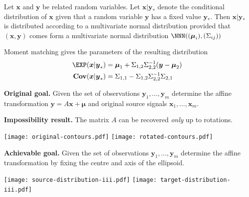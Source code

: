 \documentclass[landscape,footrule]{foils}
\renewcommand{\vec}[1]{\boldsymbol{#1}}
\newcommand{\COV}{\mathbf{Cov}}
\begin{document}
Let $\vec{x}$ and $\vec{y}$ be related random variables. 
Let $\vec{x}|\vec{y}_*$ denote the conditional distribution of $\vec{x}$ given that a random variable $\vec{y}$ has a fixed value $\vec{y}_*$.
Then $\vec{x}|\vec{y}_*$ is distributed according to a multivariate normal distribution provided that 
 $(\vec{x},\vec{y})$ comes form a multivariate normal distribution $\NNN((\vec{\mu}_i),(\Sigma_{ij}))$

\begin{triangles}
\item Moment matching gives the parameters of the resulting distribution 
\begin{align*}
\EXP(\vec{x}|\vec{y}_*)&= \vec{\mu}_1+ \Sigma_{1,2}\Sigma_{2,2}^{-1}(\vec{y}-\vec{\mu}_2)\\
\COV(\vec{x}|\vec{y}_*)&= \Sigma_{1,1}-\Sigma_{1,2}\Sigma_{2,2}^{-1}\Sigma_{2,1}\\
\end{align*}
\end{triangles}







\textbf{Original goal.} 
Given the set of observations $\vec{y}_1,\ldots, \vec{y}_m$ determine the affine transformation $\vec{y}=A\vec{x}+\vec{\mu}$ and original source signals  $\vec{x}_1,\ldots, \vec{x}_m$.


\textbf{Impossibility result.}
The matrix $A$ can be recovered \emph{only} up to rotations.


\begin{center}
\texttt{[image: original-contours.pdf]}
\raisebox{4.0cm}{$\quad\xrightarrow{\vec{y}=A\vec{x}+\vec{\mu}}\quad$}
\texttt{[image: rotated-contours.pdf]}
\end{center}\vspace*{-1cm}




\textbf{Achievable goal.}
Given the set of observations $\vec{y}_1,\ldots, \vec{y}_m$ determine the affine transformation by fixing the centre and axis of the ellipsoid.


\begin{center}
\texttt{[image: source-distribution-iii.pdf]}
\raisebox{4.0cm}{$\quad\xrightarrow{\vec{y}=A\vec{x}+\vec{\mu}}\quad$}
\texttt{[image: target-distribution-iii.pdf]}
\end{center}\vspace*{-1cm}
\end{document}
